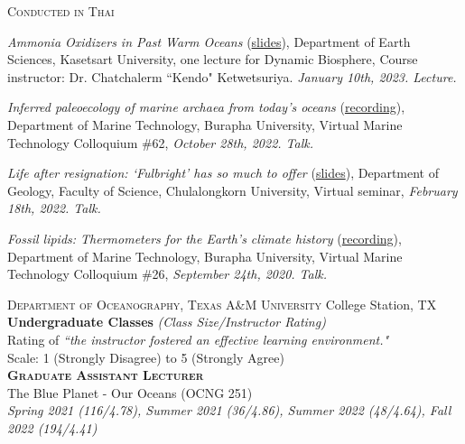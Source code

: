 \documentclass[10pt, letter]{article}
\newcommand{\margintext}[1]{\marginnote{\normalsize\textbf #1 |}}
\begin{document}
\textsc{Conducted in Thai}
\begin{etaremune}
\item \textit{Ammonia Oxidizers in Past Warm Oceans} (\href{https://tamucs-my.sharepoint.com/:b:/g/personal/rrattan_tamu_edu/ESdkQzE0k-xNufbKOW7oMxwBUtcPdXOOMauWxMsfEqFgkA?e=Xk2nDl}{slides}), Department of Earth Sciences, Kasetsart University, one lecture for Dynamic Biosphere, Course instructor: Dr. Chatchalerm ``Kendo" Ketwetsuriya. \textit{January 10th, 2023. Lecture.}

\item \textit{Inferred paleoecology of marine archaea from today's oceans} (\href{https://fb.watch/grZcLZQSbV/}{recording}), Department of Marine Technology, Burapha University, Virtual Marine Technology Colloquium \#62, \textit{October 28th, 2022. Talk.}

\item \textit{Life after resignation: `Fulbright' has so much to offer} (\href{https://www.canva.com/design/DAE4hfYUXJk/3E9PACt31gAkqAKfjnURkg/edit?utm_content=DAE4hfYUXJk&utm_campaign=designshare&utm_medium=link2&utm_source=sharebutton}{slides}), Department of Geology, Faculty of Science, Chulalongkorn University, Virtual seminar, \textit{February 18th, 2022. Talk.}

\item \textit{Fossil lipids: Thermometers for the Earth's climate history} (\href{https://www.facebook.com/watch/?v=405982837057621}{recording}), Department of Marine Technology, Burapha University, Virtual Marine Technology Colloquium \#26, \textit{September 24th, 2020. Talk.}

\end{etaremune}

\bigskip
\margintext{Teaching}
\textsc{Department of Oceanography, Texas A\&M University} \hfill College Station, TX \\
\textbf{Undergraduate Classes} \textit{(Class Size/Instructor Rating)} \\
\footnotesize 
Rating of \textit{``the instructor fostered an effective learning environment."}\\
Scale: 1 (Strongly Disagree) to 5 (Strongly Agree) \\

\normalsize
\textbf{\textsc{Graduate Assistant Lecturer}} \\
The Blue Planet - Our Oceans (OCNG 251) \\
\textit{Spring 2021 (116/4.78), Summer 2021 (36/4.86), Summer 2022 (48/4.64), Fall 2022 (194/4.41)}
\end{document}
